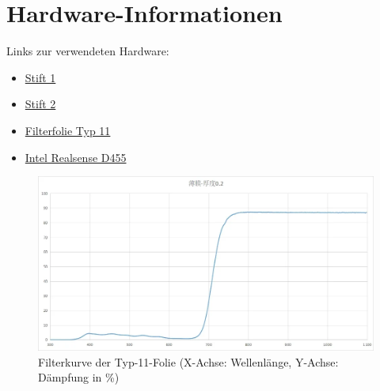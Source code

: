 \section{Hardware-Informationen}
\label{hw-info}
Links zur verwendeten Hardware:
\begin{itemize}
    \item \href{https://de.aliexpress.com/item/32809373195.html?...}{Stift 1}
    \item \href{https://de.aliexpress.com/item/32809984821.html?...}{Stift 2}
    \item \href{https://de.aliexpress.com/item/4000575587804.html?...}{Filterfolie Typ 11}
    \item \href{https://realsenseai.com/stereo-depth-cameras/real-sense-depth-camera-d455/?wapkw=d455}{Intel Realsense D455}
\end{itemize}

\begin{figure}[H]
    \centering
    \includegraphics[width=0.5\linewidth]{graphics/filter_kurve.png}
    \caption{Filterkurve der Typ-11-Folie (X-Achse: Wellenlänge, Y-Achse: Dämpfung in \%)}
    \label{fig:filter_kurve}
\end{figure}